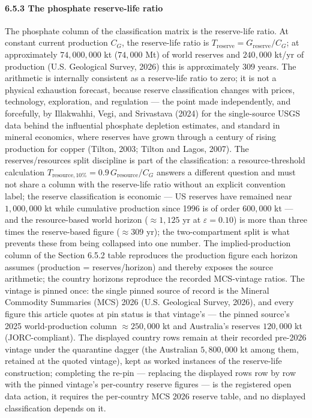\documentclass[11pt]{article}
\begin{document}
\paragraph{6.5.3 The phosphate reserve-life
ratio}\label{the-phosphate-reserve-life-ratio}

The phosphate column of the classification matrix is the reserve-life
ratio. At constant current production \(C_G\), the reserve-life ratio is
\(T_{\mathrm{reserve}} = G_{\mathrm{reserve}}/C_G\); at approximately
\(74{,}000{,}000\) kt (\(74{,}000\) Mt) of world reserves and
\(240{,}000\) kt/\allowbreak{}yr of production (U.S. Geological Survey, 2026) this is
approximately \(309\) years. The arithmetic is internally consistent as
a reserve-life ratio to zero; it is not a physical exhaustion forecast,
because reserve classification changes with prices, technology,
exploration, and regulation --- the point made independently, and
forcefully, by Illakwahhi, Vegi, and Srivastava (2024) for the
single-source USGS data behind the influential phosphate depletion
estimates, and standard in mineral economics, where reserves have grown
through a century of rising production for copper (Tilton, 2003; Tilton
and Lagos, 2007). The reserves/\allowbreak{}resources split discipline is part of the
classification: a resource-threshold calculation
\(T_{\mathrm{resource},10\%} = 0.9\, G_{\mathrm{resource}}/C_G\) answers
a different question and must not share a column with the reserve-life
ratio without an explicit convention label; the reserve classification
is economic --- US reserves have remained near \(1{,}000{,}000\) kt
while cumulative production since 1996 is of order \(600{,}000\) kt ---
and the resource-based world horizon (\(\approx 1{,}125\) yr at
\(\varepsilon = 0.10\)) is more than three times the reserve-based
figure (\(\approx 309\) yr); the two-compartment split is what prevents
these from being collapsed into one number. The implied-production
column of the Section 6.5.2 table reproduces the production figure each
horizon assumes (production = reserves/\allowbreak{}horizon) and thereby exposes the
source arithmetic; the country horizons reproduce the recorded
MCS-vintage ratios. The vintage is pinned once: the single pinned source
of record is the Mineral Commodity Summaries (MCS) 2026 (U.S. Geological
Survey, 2026), and every figure this article quotes at pin status is
that vintage's --- the pinned source's 2025 world-production column
\(\approx 250{,}000\) kt and Australia's reserves \(120{,}000\) kt
(JORC-compliant). The displayed country rows remain at their recorded
pre-2026 vintage under the quarantine dagger (the Australian
\(5{,}800{,}000\) kt among them, retained at the quoted vintage), kept as worked instances of the reserve-life construction; completing
the re-pin --- replacing the displayed rows row by row with the pinned
vintage's per-country reserve figures --- is the registered open data
action, it requires the per-country MCS 2026 reserve table, and no
displayed classification depends on it.
\end{document}
